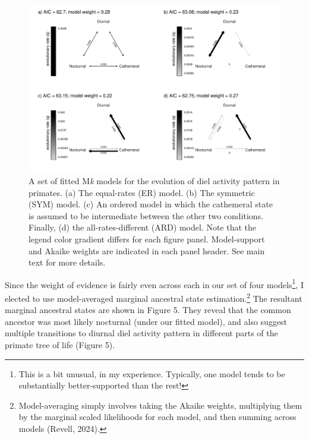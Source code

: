 \documentclass{article}
\begin{document}
\begin{figure}
\includegraphics[width=1\linewidth]{Revell.AncestralReconstruction_files/figure-latex/fig4-1} \caption{A set of fitted M\emph{k} models for the evolution of diel activity pattern in primates. (a) The equal-rates (ER) model. (b) The symmetric (SYM) model. (c) An ordered model in which the cathemeral state is assumed to be intermediate between the other two conditions. Finally, (d) the all-rates-different (ARD) model. Note that the legend color gradient differs for each figure panel. Model-support and Akaike weights are indicated in each panel header. See main text for more details.}\label{fig:fig4}
\end{figure}

Since the weight of evidence is fairly even across each in our set of four models\footnote{This is a bit unusual, in my experience. Typically, one model tends to be substantially better-supported than the rest!}, I elected to use model-averaged marginal ancestral state estimation.\footnote{Model-averaging simply involves taking the Akaike weights, multiplying them by the marginal scaled likelihoods for each model, and then summing across models (Revell, 2024).} The resultant marginal ancestral states are shown in Figure 5. They reveal that the common ancestor was most likely nocturnal (under our fitted model), and also suggest multiple transitions to diurnal diel activity pattern in different parts of the primate tree of life (Figure 5).
\end{document}
